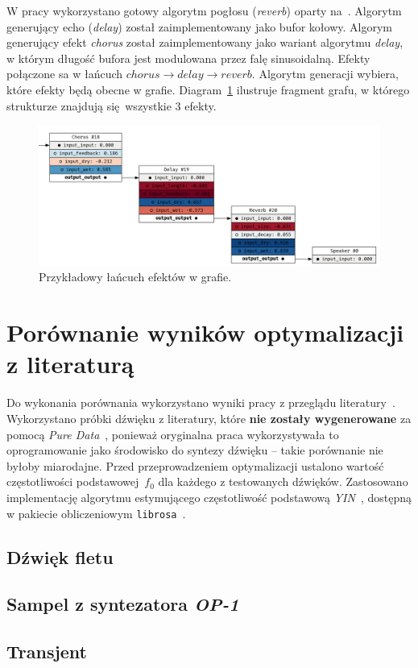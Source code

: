 W pracy wykorzystano gotowy algorytm pogłosu (\textit{reverb}) oparty na~\cite{reverb}.
Algorytm generujący echo (\textit{delay}) został zaimplementowany jako bufor kołowy.
Algorym generujący efekt \textit{chorus} został zaimplementowany jako wariant algorytmu \textit{delay},
w którym długość bufora jest modulowana przez falę sinusoidalną. Efekty połączone sa w łańcuch
$chorus \rightarrow delay \rightarrow reverb$. Algorytm generacji wybiera, które efekty będą obecne w grafie.
Diagram~\ref{fig:example_generated_effects} ilustruje fragment grafu,
w którego strukturze znajdują się wszystkie 3 efekty.

\begin{figure}[H]
    \centering
    \includegraphics[width=1.0\linewidth]{rys06/example_generated_effects.png}
    \caption{
      Przykładowy łańcuch efektów w grafie.
    }\label{fig:example_generated_effects}
\end{figure}

\section{Porównanie wyników optymalizacji z literaturą~\cite{evolutionary_puredata}}

Do wykonania porównania wykorzystano wyniki pracy z przeglądu
literatury~\cite{evolutionary_puredata_results}. Wykorzystano próbki dźwięku
z literatury, które \textbf{nie zostały wygenerowane} za pomocą
\textit{Pure Data}~\cite{pure_data}, ponieważ oryginalna praca wykorzystywała
to oprogramowanie jako środowisko do syntezy dźwięku -- takie porównanie
nie byłoby miarodajne.
Przed przeprowadzeniem optymalizacji ustalono wartość częstotliwości podstawowej~$f_0$
dla każdego z testowanych dźwięków. Zastosowano implementację algorytmu
estymującego częstotliwość podstawową
\textit{YIN}~\cite{yin_pitch_estimation}, dostępną w pakiecie obliczeniowym
\texttt{librosa}~\cite{librosa}.

\subsection{Dźwięk fletu}

\subsection{Sampel z syntezatora \textit{OP-1}}

\subsection{Transjent}
